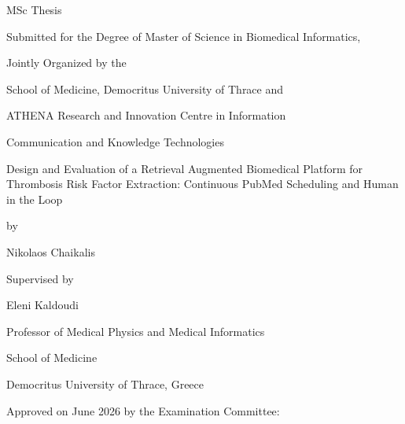 \clearpage
\thispagestyle{empty}
\begin{center}

{\large MSc Thesis\par}
\vspace{0.2cm}
{\small Submitted for the Degree of Master of Science in Biomedical Informatics,\par}
{\small Jointly Organized by the\par}
{\small School of Medicine, Democritus University of Thrace and\par}
{\small ATHENA Research and Innovation Centre in Information\par}
{\small Communication and Knowledge Technologies\par}

\vspace{1.5cm}

{\Large Design and Evaluation of a Retrieval Augmented Biomedical Platform for Thrombosis Risk Factor Extraction: Continuous PubMed Scheduling and Human in the Loop \par}

\vspace{1.0cm}
{\large by\par}
\vspace{0.3cm}
{\large Nikolaos Chaikalis\par}

\vspace{1.5cm}

{\large Supervised by\par}
\vspace{0.3cm}
{\large Eleni Kaldoudi\par}
{\small Professor of Medical Physics and Medical Informatics\par}
{\small School of Medicine\par}
{\small Democritus University of Thrace, Greece\par}

\vfill

{\small Approved on June 2026 by the Examination Committee:\par}
\vspace{0.8cm}


\end{center}
